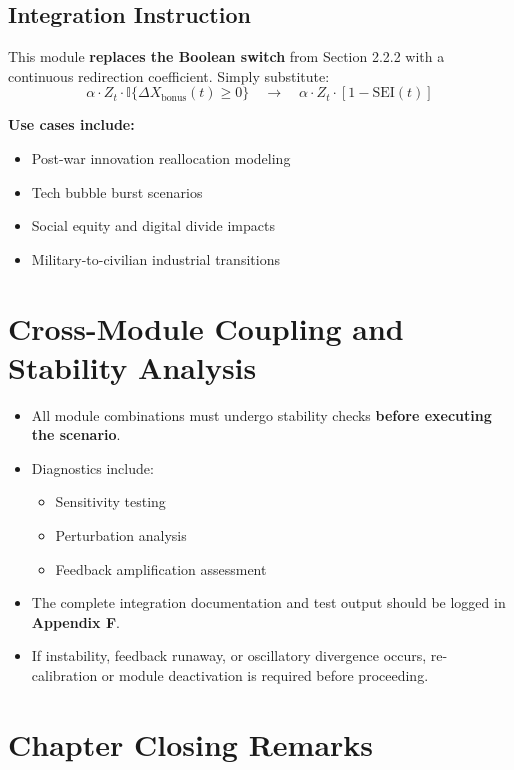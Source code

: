 \documentclass[12pt]{report}
\begin{document}
\subsection*{Integration Instruction}
This module \textbf{replaces the Boolean switch} from Section 2.2.2 with a continuous redirection coefficient. Simply substitute:
\[
\alpha \cdot Z_t \cdot \mathbb{I} \{\Delta X_{\text{bonus}}(t) \geq 0\} \quad \longrightarrow \quad \alpha \cdot Z_t \cdot \left[1 - \text{SEI}(t)\right]
\]

\textbf{Use cases include:}
\begin{itemize}
  \item Post-war innovation reallocation modeling
  \item Tech bubble burst scenarios
  \item Social equity and digital divide impacts
  \item Military-to-civilian industrial transitions
\end{itemize}

\vspace{1em}
\section{Cross-Module Coupling and Stability Analysis}

\begin{itemize}
  \item All module combinations must undergo stability checks \textbf{ before executing the scenario}.
  \item Diagnostics include: \begin{itemize}
    \item Sensitivity testing
    \item Perturbation analysis
    \item Feedback amplification assessment
  \end{itemize}
  \item The complete integration documentation and test output should be logged in \textbf{Appendix F}.
  \item If instability, feedback runaway, or oscillatory divergence occurs, re-calibration or module deactivation is required before proceeding.
\end{itemize}

\vspace{1em}
\section{Chapter Closing Remarks}
\end{document}

